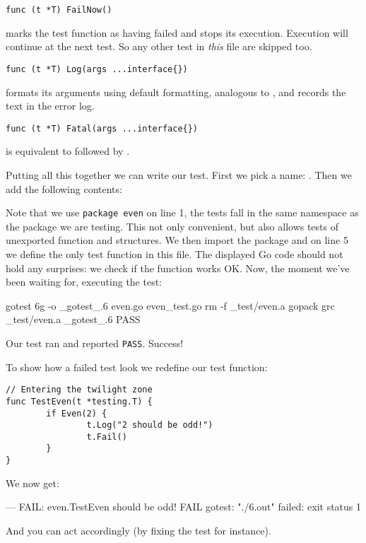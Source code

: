 \begin{lstlisting}[numbers=none]
func (t *T) FailNow()
\end{lstlisting}
 marks the test function as having failed and stops its execution.
Execution will continue at the next test. So any other test in
\emph{this} file are skipped too.

\begin{lstlisting}[numbers=none]
func (t *T) Log(args ...interface{})
\end{lstlisting}
 formats its arguments using default formatting, analogous to
, and records the text in the error log.

\begin{lstlisting}[numbers=none]
func (t *T) Fatal(args ...interface{})
\end{lstlisting}
 is equivalent to  followed by .

Putting all this together we can write our test. First
we pick a name: . Then we add the following contents:

Note that we use \lstinline{package even} on line 1, the tests fall in the same
namespace as the package we are testing. This not only convenient, but
also allows tests of unexported function and structures. We then import
the  package and on line 5 we define the only test
function in this file. The displayed Go code should not hold any
surprises: we check if the  function works OK. 
Now, the moment we've been waiting for, executing the test:
\begin{display}
\pr gotest
6g -o \_gotest\_.6 even.go  even\_test.go
rm -f \_test/even.a
gopack grc \_test/even.a \_gotest\_.6 
PASS
\end{display}
\noindent{}Our test ran and reported \texttt{PASS}. Success! 

To show how a failed
test look we redefine our test function:
\begin{lstlisting}
// Entering the twilight zone
func TestEven(t *testing.T) {
        if Even(2) {
                t.Log("2 should be odd!")
                t.Fail()
        }   
}
\end{lstlisting}
We now get:
\begin{display}
--- FAIL: even.TestEven
\qquad{} should be odd!
FAIL
gotest: "./6.out" failed: exit status 1
\end{display}
\noindent{}And you can act accordingly (by fixing the test for instance).


